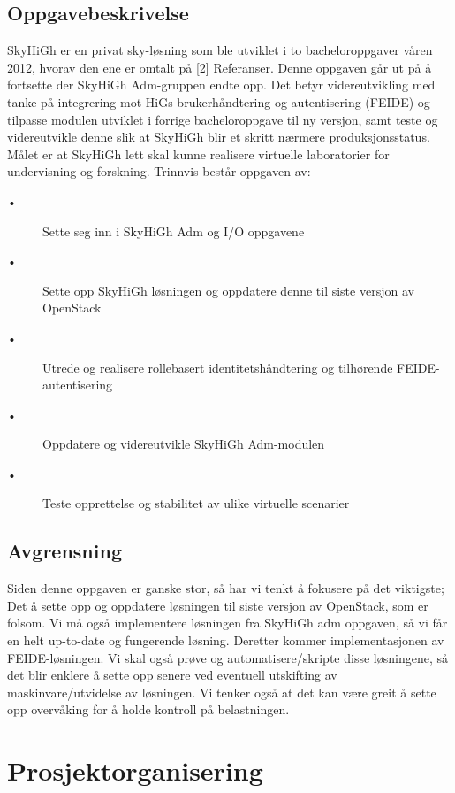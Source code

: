 \documentclass[12pt,a4paper]{article}
\newcommand{\tab}{\hspace*{2em}}
\begin{document}
\subsection{Oppgavebeskrivelse}
SkyHiGh er en privat sky-løsning som ble utviklet i to bacheloroppgaver våren 2012, hvorav den ene er omtalt på [2] Referanser. \newline \newline
Denne oppgaven går ut på å fortsette der SkyHiGh Adm-gruppen endte opp. Det betyr
videreutvikling med tanke på integrering mot HiGs brukerhåndtering og autentisering (FEIDE) og
tilpasse modulen utviklet i forrige bacheloroppgave til ny versjon, samt teste og videreutvikle denne slik at SkyHiGh blir et skritt nærmere produksjonsstatus. Målet er at SkyHiGh lett skal kunne realisere virtuelle laboratorier for undervisning og forskning. Trinnvis består oppgaven av:
\begin{description}
	\item[\tab •] Sette seg inn i SkyHiGh Adm og I/O oppgavene
	\item[\tab •] Sette opp SkyHiGh løsningen og oppdatere denne til siste versjon av OpenStack
	\item[\tab •] Utrede og realisere rollebasert identitetshåndtering og tilhørende FEIDE-autentisering
	\item[\tab •] Oppdatere og videreutvikle SkyHiGh Adm-modulen
	\item[\tab •] Teste opprettelse og stabilitet av ulike virtuelle scenarier
\end{description}

\subsection{Avgrensning}
Siden denne oppgaven er ganske stor, så har vi tenkt å fokusere på det viktigste; Det å sette opp og oppdatere løsningen til siste versjon av OpenStack, som er folsom. Vi må også implementere løsningen fra SkyHiGh adm oppgaven, så vi får en helt up-to-date og fungerende løsning. Deretter kommer implementasjonen av FEIDE-løsningen. Vi skal også prøve og automatisere/skripte disse løsningene, så det blir enklere å sette opp senere ved eventuell utskifting av maskinvare/utvidelse av løsningen. Vi tenker også at det kan være greit å sette opp overvåking for å holde kontroll på belastningen. 

\section{Prosjektorganisering}
\end{document}
